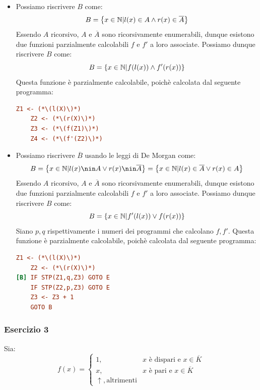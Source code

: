 \begin{itemize}
  \item[\(B\):] Possiamo riscrivere \(B\) come:
  \begin{equation}
    B=\displaystyle{\left\{{x \in \mathbb{N}\vert l(x) \in A \land r(x) \in \overline{A}}\right\}}
  \end{equation}
  Essendo \(A\) ricorsivo, \(A\) e \(\overline{A}\) sono ricorsivamente enumerabili, dunque esistono due funzioni parzialmente calcolabili \(f\) e \(f'\) a loro associate. Possiamo dunque riscrivere \(B\) come:
  \begin{equation}
    B=\displaystyle{\left\{{x \in \mathbb{N}\vert f(l(x)) \land f'(r(x))}\right\}}
  \end{equation}
  Questa funzione è parzialmente calcolabile, poichè calcolata dal seguente programma:
  \begin{lstlisting}[language=ini, caption={ }]
    Z1 <- (*\(l(X)\)*)
    Z2 <- (*\(r(X)\)*)
    Z3 <- (*\(f(Z1)\)*)
    Z4 <- (*\(f'(Z2)\)*)
  \end{lstlisting}
  \item[\(\overline{B}\):] Possiamo riscrivere \(\overline{B}\) usando le leggi di De Morgan come:
  \begin{equation}
    B=\cbrakets{x \in \mbN \vert l(x) \nin A \lor r(x) \nin \overline{A}}=\cbrakets{x \in \mbN \vert l(x) \in \overline{A} \lor r(x) \in A}
  \end{equation}
  Essendo \(A\) ricorsivo, \(A\) e \(\overline{A}\) sono ricorsivamente enumerabili, dunque esistono due funzioni parzialmente calcolabili \(f\) e \(f'\) a loro associate. Possiamo dunque riscrivere \(B\) come:
  \begin{equation}
    B=\displaystyle{\left\{{x \in \mathbb{N}\vert f'(l(x)) \lor f(r(x))}\right\}}
  \end{equation}
  Siano \(p,q\) rispettivamente i numeri dei programmi che calcolano \(f,f'\). Questa funzione è parzialmente calcolabile, poichè calcolata dal seguente programma:
  \begin{lstlisting}[language=ini, caption={ }]
    Z1 <- (*\(l(X)\)*)
    Z2 <- (*\(r(X)\)*)
[B] IF STP(Z1,q,Z3) GOTO E
    IF STP(Z2,p,Z3) GOTO E
    Z3 <- Z3 + 1
    GOTO B
  \end{lstlisting}
\end{itemize}

\subsubsection{Esercizio 3}

Sia:
\begin{equation}
  f(x) = \begin{cases}
    1, & x \text{ è dispari e } x \in \overline{K}\\
    x, & x \text{ è pari e } x \in \overline{K}\\
    \uparrow, \text{altrimenti}
  \end{cases}
\end{equation}

